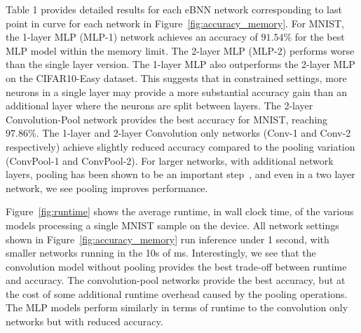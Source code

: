 \documentclass[10pt,emptycopyrightspace]{ewsn-proc}
\begin{document}
Table 1 provides detailed results for each eBNN network corresponding to last point in curve for each network in Figure~\ref{fig:accuracy_memory}. For MNIST, the 1-layer MLP (MLP-1) network achieves an accuracy of $91.54\%$ for the best MLP model within the memory limit. The 2-layer MLP (MLP-2) performs worse than the single layer version. The 1-layer MLP also outperforms the 2-layer MLP on the CIFAR10-Easy dataset. This suggests that in constrained settings, more neurons in a single layer may provide a more substantial accuracy gain than an additional layer where the neurons are split between layers. The 2-layer Convolution-Pool network provides the best accuracy for MNIST, reaching $97.86\%$. The 1-layer and 2-layer Convolution only networks (Conv-1 and Conv-2 respectively) achieve slightly reduced accuracy compared to the pooling variation (ConvPool-1 and ConvPool-2). For larger networks, with additional network layers, pooling has been shown to be an important step~\cite{scherer2010evaluation}, and even in a two layer network, we see pooling improves performance. 


Figure~\ref{fig:runtime} shows the average runtime, in wall clock time, of the various models processing a single MNIST sample on the device. All network settings shown in Figure~\ref{fig:accuracy_memory} run inference under 1 second, with smaller networks running in the 10s of ms. Interestingly, we see that the convolution model without pooling provides the best trade-off between runtime and accuracy. The convolution-pool networks provide the best accuracy, but at the cost of some additional runtime overhead caused by the pooling operations. The MLP models perform similarly in terms of runtime to the convolution only networks but with reduced accuracy.
\end{document}
